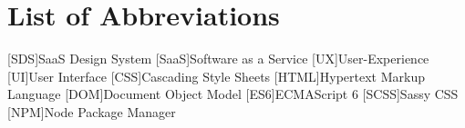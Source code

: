 \section*{List of Abbreviations}
\begin{acronym}
    [SDS]{SaaS Design System}
    [SaaS]{Software as a Service}
    [UX]{User-Experience}
    [UI]{User Interface}
    [CSS]{Cascading Style Sheets}
    [HTML]{Hypertext Markup Language}
    [DOM]{Document Object Model}
    [ES6]{ECMAScript 6}
    [SCSS]{Sassy CSS}
    [NPM]{Node Package Manager}

\end{acronym}